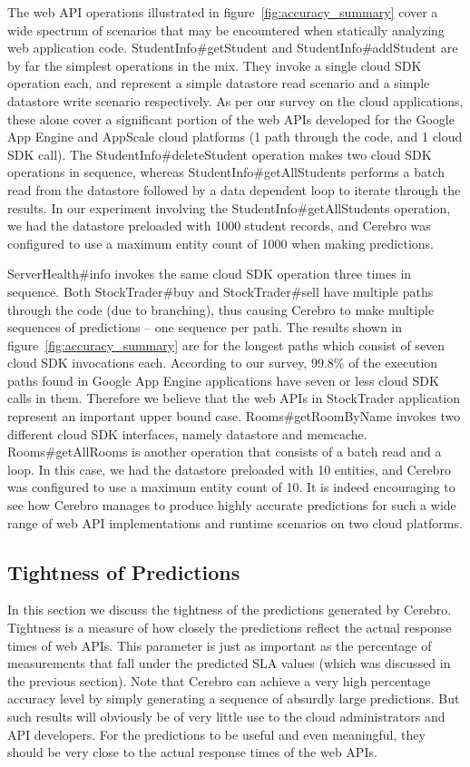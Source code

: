 The web API operations illustrated in figure~\ref{fig:accuracy_summary} cover a wide spectrum of scenarios that may be encountered
when statically analyzing web application code. StudentInfo\#getStudent and StudentInfo\#addStudent are by far the simplest
operations in the mix. They invoke a single cloud SDK operation each, and represent a simple datastore read scenario and a simple
datastore write scenario respectively. As per our survey on the cloud applications, these alone cover a significant portion of the 
web APIs developed for the Google App Engine and AppScale cloud platforms (1 path through the code, and 1 cloud SDK call). 
The StudentInfo\#deleteStudent operation makes two cloud SDK operations in sequence, whereas
StudentInfo\#getAllStudents performs a batch read from the datastore followed by a data dependent loop to iterate through the results.
In our experiment involving the StudentInfo\#getAllStudents operation, we had the datastore preloaded with 1000 student records, 
and Cerebro was configured to use a maximum entity count of 1000 when making predictions.

ServerHealth\#info invokes the same cloud SDK operation three times in sequence. Both StockTrader\#buy and StockTrader\#sell have
multiple paths through the code (due to branching), thus causing Cerebro to make multiple sequences of predictions -- one sequence
per path. The results shown in figure~\ref{fig:accuracy_summary} are for the longest paths which consist of seven cloud SDK invocations each. According to
our survey, 99.8\% of the execution paths found in Google App Engine applications have seven or less cloud SDK calls in them. Therefore we believe
that the web APIs in StockTrader application represent an important upper bound case. Rooms\#getRoomByName
invokes two different cloud SDK interfaces, namely datastore and memcache. Rooms\#getAllRooms is another operation that consists of
a batch read and a loop. In this case, we had the datastore preloaded with 10 entities, and Cerebro was configured to use a maximum entity
count of 10. It is indeed encouraging to see how Cerebro manages to produce highly accurate predictions for such a wide range 
of web API implementations and runtime scenarios on two cloud platforms.

\subsection{Tightness of Predictions}
In this section we discuss the tightness of the predictions generated by Cerebro. Tightness is a measure of how closely the predictions
reflect the actual response times of web APIs. This parameter is just as important as the percentage of measurements that fall under
the predicted SLA values (which 
was discussed in the previous section). Note that Cerebro can achieve a very high percentage accuracy level by simply generating a 
sequence of absurdly large predictions. But such results will obviously be of very little use to the cloud administrators and API
developers. For the predictions to be useful and even meaningful, they should be very close to the actual response times of the web APIs.

